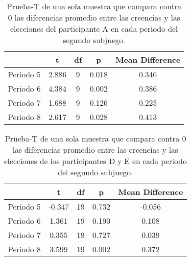 \begin{table}
\caption[Diferencias Relativas en el Subjuego 2 omitiendo la multiplicación $\cdot p$, Participante A]{Prueba-T de una sola muestra que compara contra 0 las diferencias promedio entre las creencias y las elecciones del participante A en cada periodo del segundo subjuego.}
\label{DN_Sub1}
\centering
\begin{tabular}{l | c c c c}  %
\toprule
\textbf{} & \textbf{t} & \textbf{df} & \textbf{p} & \textbf{Mean Difference}\\
\midrule
Periodo 5 & 2.886 & 9 & 0.018 & 0.346 \\
Periodo 6 & 4.384 & 9 & 0.002 & 0.386 \\
Periodo 7 & 1.688 & 9 & 0.126 & 0.225 \\
Periodo 8 & 2.617 & 9 & 0.028 & 0.413 \\
\bottomrule
\end{tabular}
\end{table}

\begin{table}
\caption[Diferencias Relativas en el Subjuego 2 omitiendo la multiplicación $\cdot p$, Participantes D y E]{Prueba-T de una sola muestra que compara contra 0 las diferencias promedio entre las creencias y las elecciones de los participantes D y E en cada periodo del segundo subjuego.}
\label{DN_Sub1}
\centering
\begin{tabular}{l | c c c c}  %
\toprule
\textbf{} & \textbf{t} & \textbf{df} & \textbf{p} & \textbf{Mean Difference}\\
\midrule
Periodo 5 & -0.347 & 19 & 0.732 & -0.056 \\
Periodo 6 & 1.361 & 19 & 0.190 & 0.108 \\
Periodo 7 & 0.355 & 19 & 0.727 & 0.039 \\
Periodo 8 & 3.599 & 19 & 0.002 & 0.372 \\
\bottomrule
\end{tabular}
\end{table}


